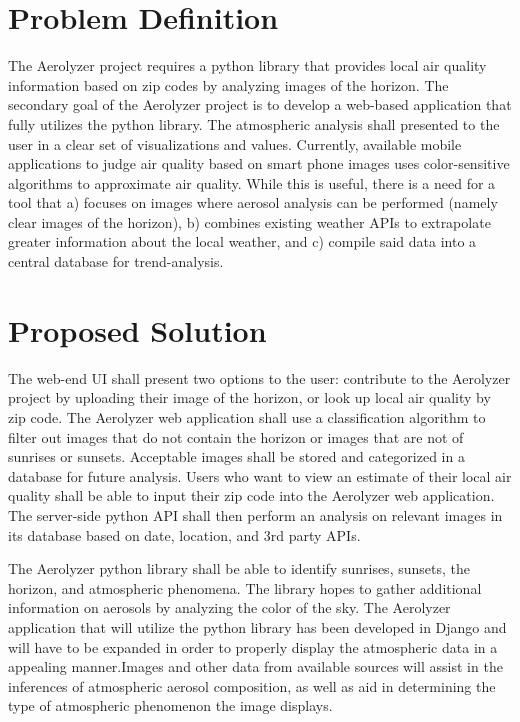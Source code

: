 \documentclass[letterpaper,10pt,draftclsnofoot,onecolumn]{IEEEtran}
\begin{document}
\clearpage
\begin{flushleft}
\section{Problem Definition}
The Aerolyzer project requires a python library that provides local air quality information based on zip codes by analyzing images of the horizon. The secondary goal of the Aerolyzer project is to develop a web-based application that fully utilizes the python library. The atmospheric analysis shall presented to the user in a clear set of visualizations and values. Currently, available mobile applications to judge air quality based on smart phone images uses color-sensitive algorithms to approximate air quality. While this is useful, there is a need for a tool that a) focuses on images where aerosol analysis can be performed (namely clear images of the horizon), b) combines existing weather APIs to extrapolate greater information about the local weather, and c) compile said data into a central database for trend-analysis.

\section{Proposed Solution}
The web-end UI shall present two options to the user: contribute to the Aerolyzer project by uploading their image of the horizon, or look up local air quality by zip code. The Aerolyzer web application shall use a classification algorithm to filter out images that do not contain the horizon or images that are not of sunrises or sunsets. Acceptable images shall be stored and categorized in a database for future analysis. Users who want to view an estimate of their local air quality shall be able to input their zip code into the Aerolyzer web application. The server-side python API shall then perform an analysis on relevant images in its database based on date, location, and 3rd party APIs. \par The Aerolyzer python library shall be able to identify sunrises, sunsets, the horizon, and atmospheric phenomena. The library hopes to gather additional information on aerosols by analyzing the color of the sky. The Aerolyzer application that will utilize the python library has been developed in Django and will have to be expanded in order to properly display the atmospheric data in a appealing manner.Images and other data from available sources will assist in the inferences of atmospheric aerosol composition, as well as aid in determining the type of atmospheric phenomenon the image displays.


\end{flushleft}
\end{document}
